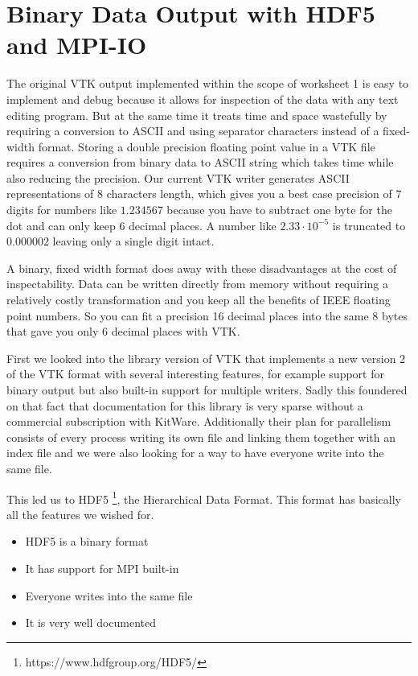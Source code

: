 \chapter{Binary Data Output with HDF5 and MPI-IO}
\label{cha:hdf5}

The original VTK output implemented within the scope of worksheet 1 is easy to
implement and debug because it allows for inspection of the data with any text
editing program. But at the same time it treats time and space wastefully by
requiring a conversion to ASCII and using separator characters instead of a
fixed-width format. Storing a double precision floating point value in a VTK
file requires a conversion from binary data to ASCII string which takes time
while also reducing the precision. Our current VTK writer generates ASCII
representations of 8 characters length, which gives you a best case precision of
7 digits for numbers like $1.234567$ because you have to subtract one byte for
the dot and can only keep 6 decimal places. A number like $2.33 \cdot 10^{-5}$
is truncated to $0.000002$ leaving only a single digit intact.

A binary, fixed width format does away with these disadvantages at the cost of
inspectability. Data can be written directly from memory without requiring a
relatively costly transformation and you keep all the benefits of IEEE floating
point numbers. So you can fit a precision 16 decimal places into the same 8
bytes that gave you only 6 decimal places with VTK.

First we looked into the library version of VTK that implements a new version 2
of the VTK format with several interesting features, for example support for
binary output but also built-in support for multiple writers. Sadly this
foundered on that fact that documentation for this library is very sparse
without a commercial subscription with KitWare. Additionally their plan for
parallelism consists of every process writing its own file and linking them
together with an index file and we were also looking for a way to have everyone
write into the same file.

This led us to HDF5 \footnote{https://www.hdfgroup.org/HDF5/}, the Hierarchical
Data Format. This format has basically all the features we wished for.

\begin{itemize}
\item HDF5 is a binary format
\item It has support for MPI built-in
\item Everyone writes into the same file
\item It is very well documented
\end{itemize}

